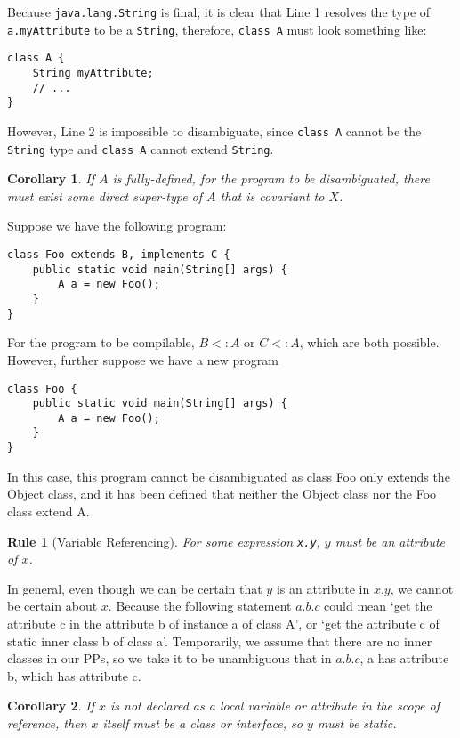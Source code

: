 \documentclass{article}
\newtheorem{inferencerule}{Rule}[section]
\newtheorem{inferencecorollary}{Corollary}[inferencerule]
\begin{document}
\noindent Because \texttt{java.lang.String} is final, it is clear that
Line 1 resolves the type of \texttt{a.myAttribute} to be a \texttt{String},
therefore, \texttt{class A} must look something like:
\begin{verbatim}
class A {
    String myAttribute;
    // ...
}
\end{verbatim}
However, Line 2 is impossible to disambiguate,
since \texttt{class A} cannot be the \texttt{String} type
and \texttt{class A} cannot extend \texttt{String}.
\begin{inferencecorollary}
If $A$ is fully-defined, for the program to be disambiguated, there must exist some
direct super-type of $A$ that is covariant to $X$.\\
\end{inferencecorollary}
\noindent Suppose we have the following program:
\begin{verbatim}
class Foo extends B, implements C {
    public static void main(String[] args) {
        A a = new Foo();
    }
}
\end{verbatim}

\noindent For the program to be compilable, $B<:A$ or $C<:A$, which are both possible. However,
further suppose we have a new program

\begin{verbatim}
class Foo {
    public static void main(String[] args) {
        A a = new Foo();
    }
}
\end{verbatim}
\noindent In this case, this program cannot be disambiguated as class Foo only
extends the Object class, and it has been defined that neither the Object class nor the Foo
class extend A.

\begin{inferencerule}[Variable Referencing]
    For some expression \texttt{x.y}, $y$ must be an attribute of $x$.
\end{inferencerule}

\noindent In general, even though we can be certain that $y$ is an attribute in $x.y$, we cannot
be certain about $x$. Because the following statement $a.b.c$ could mean `get the attribute c
in the attribute b of instance a of class A', or `get the attribute c of static inner class b
of class a'. Temporarily, we assume that there are no inner classes in our PPs, so we take 
it to be unambiguous that in $a.b.c$, a has attribute b, which has attribute c.

\begin{inferencecorollary}
    If $x$ is not declared as a local variable or attribute in the scope of reference,
    then $x$ itself must be a class or interface, so $y$ must be static.
\end{inferencecorollary}
\end{document}
